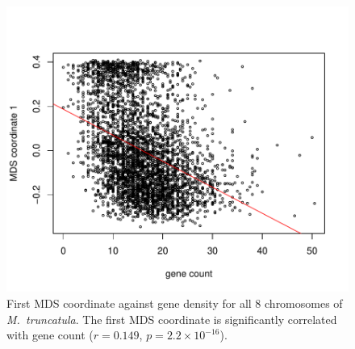 \documentclass[11pt, oneside]{article}   	%
\begin{document}
\begin{figure}
    \begin{center}
       \includegraphics{MDS_1D_against_gene_count_all_chr_win104_with_lm_update}
    \end{center}
    \caption{
        First MDS coordinate against gene density for all 8 chromosomes of \textit{M.~truncatula}.
        The first MDS coordinate is significantly correlated with gene count ($r=0.149$, $p=2.2\times 10^{-16}$). 
        \label{sfig:mds_gene_count}
    }
\end{figure}
\end{document}
